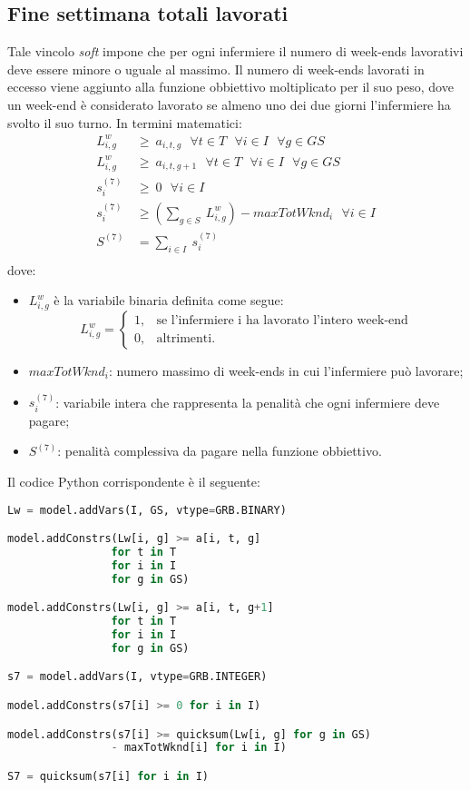 \subsection{Fine settimana totali lavorati}
Tale vincolo \textit{soft} impone che per ogni infermiere il numero di week-ends lavorativi deve essere minore o uguale al massimo. Il numero di week-ends lavorati in eccesso viene aggiunto alla funzione obbiettivo moltiplicato per il suo peso, dove un week-end è considerato lavorato se almeno uno dei due giorni l'infermiere ha svolto il suo turno. In termini matematici:
\begin{equation}
\begin{split}
L_{i, g}^w ~ &\geq ~ a_{i, t, g} ~~~ \forall t \in T ~~~ \forall i \in I ~~~ \forall g \in GS \\
L_{i, g}^w ~ &\geq ~ a_{i, t, g+1} ~~~ \forall t \in T ~~~ \forall i \in I ~~~ \forall g \in GS \\
s^{(7)}_{i} ~ &\geq ~ 0  ~~~ \forall i \in I \\
s^{(7)}_{i} &\geq (\sum_{g \in S} ~ L_{i, g}^w ) - maxTotWknd_i ~~~ \forall i \in I \\
S^{(7)} &= \sum_{i \in I} ~ s^{(7)}_{i} \\
\end{split}
\end{equation}
dove:
\begin{itemize}
\item $L_{i, g}^w$ è la variabile binaria definita come segue:
\begin{equation}
\label{eq:varLavoratoWeekEnd}
L_{i, g}^w=
\begin{cases}
1, & \text{se l'infermiere i ha lavorato l'intero week-end} \\
0, & \text{altrimenti.}
\end{cases}
\end{equation}
\item $maxTotWknd_i$: numero massimo di week-ends in cui l'infermiere può lavorare;
\item $s^{(7)}_i$: variabile intera che rappresenta la penalità che ogni infermiere deve pagare;
\item $S^{(7)}$: penalità complessiva da pagare nella funzione obbiettivo.
\end{itemize}
 
Il codice Python corrispondente è il seguente:
\begin{lstlisting}[language=Python]
Lw = model.addVars(I, GS, vtype=GRB.BINARY)

model.addConstrs(Lw[i, g] >= a[i, t, g] 
                for t in T
                for i in I
                for g in GS)

model.addConstrs(Lw[i, g] >= a[i, t, g+1] 
                for t in T
                for i in I
                for g in GS)

s7 = model.addVars(I, vtype=GRB.INTEGER)

model.addConstrs(s7[i] >= 0 for i in I)

model.addConstrs(s7[i] >= quicksum(Lw[i, g] for g in GS) 
                - maxTotWknd[i] for i in I)

S7 = quicksum(s7[i] for i in I)
\end{lstlisting}


